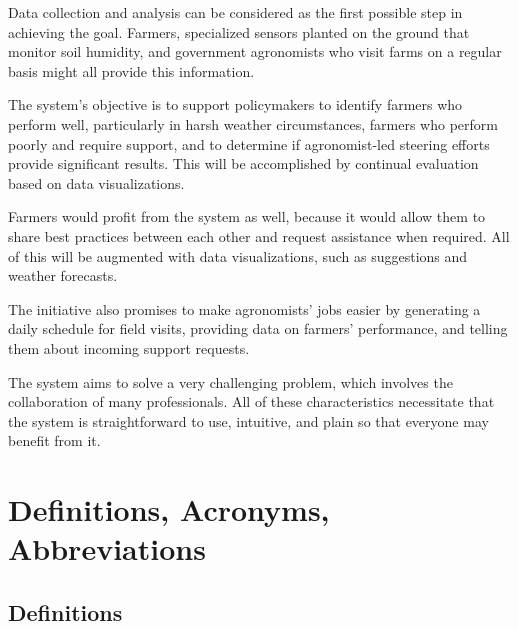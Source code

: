 Data collection and analysis can be considered as the first possible step in achieving the goal. Farmers, specialized sensors planted on the ground that monitor soil humidity, and government agronomists who visit farms on a regular basis might all provide this information.

The system's objective is to support policymakers to identify farmers who perform well, particularly in harsh weather circumstances, farmers who perform poorly and require support, and to determine if agronomist-led steering efforts provide significant results. This will be accomplished by continual evaluation based on data visualizations.

Farmers would profit from the system as well, because it would allow them to share best practices between each other and request assistance when required. All of this will be augmented with data visualizations, such as suggestions and weather forecasts.

The initiative also promises to make agronomists' jobs easier by generating a daily schedule for field visits, providing data on farmers' performance, and telling them about incoming support requests.

The system aims to solve a very challenging problem, which involves the collaboration of many professionals. All of these characteristics necessitate that the system is straightforward to use, intuitive, and plain so that everyone may benefit from it.

\section{Definitions, Acronyms, Abbreviations}

\subsection{Definitions}


